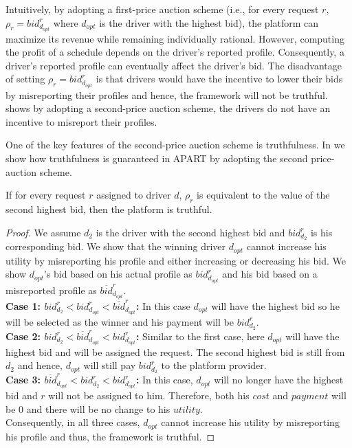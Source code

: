 Intuitively, by adopting a first-price auction scheme (i.e., for every request $r$, $\rho_r = bid_{d_{opt}}^r$ where ${d_{opt}}$ is the driver with the highest bid), the platform can maximize its revenue while remaining individually rational. However, computing the profit of a schedule depends on the driver's reported profile. Consequently, a driver's reported profile can eventually affect the driver's bid. The disadvantage of setting $\rho_r = bid_{d_{opt}}^r$ is that drivers would have the incentive to lower their bids by misreporting their profiles and hence, the framework will not be truthful.  shows by adopting a second-price auction scheme, the drivers do not have an incentive to misreport their profiles.

One of the key features of the second-price auction scheme is truthfulness. In  we show how truthfulness is guaranteed in APART by adopting the second price-auction scheme.
\begin{theorem}
\label{th:truthful}
If for every request $r$ assigned to driver $d$, $\rho_r$ is equivalent to the value of the second highest bid, then the platform is truthful.
\end{theorem}
\begin{proof}
We assume $d_2$ is the driver with the second highest bid and $bid_{d_2}^r$ is his corresponding bid. We show that the winning driver $d_{opt}$ cannot increase his utility by misreporting his profile and either increasing or decreasing his bid. We show $d_{opt}$'s bid based on his actual profile as $bid_{d_{opt}}^r$ and his bid based on a misreported profile as $\overline{bid}_{d_{opt}}^r$.\\
\textbf{Case 1: $bid_{d_2}^r < bid_{d_{opt}}^r < \overline{bid}_{d_{opt}}^r$:} In this case $d_{opt}$ will have the highest bid so he will be selected as the winner and his payment will be $bid_{d_2}^r$.\\
\textbf{Case 2: $bid_{d_2}^r < \overline{bid}_{d_{opt}}^r < bid_{d_{opt}}^r$:} Similar to the first case, here $d_{opt}$ will have the highest bid and will be assigned the request. The second highest bid is still from $d_2$ and hence, $d_{opt}$ will still pay $bid_{d_2}^r$ to the platform provider.\\
\textbf{Case 3: $\overline{bid}_{d_{opt}}^r < bid_{d_2}^r < bid_{d_{opt}}^r$:} In this case, $d_{opt}$ will no longer have the highest bid and $r$ will not be assigned to him. Therefore, both his $cost$ and $payment$ will be $0$ and there will be no change to his $utility$.\\
Consequently, in all three cases, $d_{opt}$ cannot increase his utility by misreporting his profile and thus, the framework is truthful.
\end{proof}

